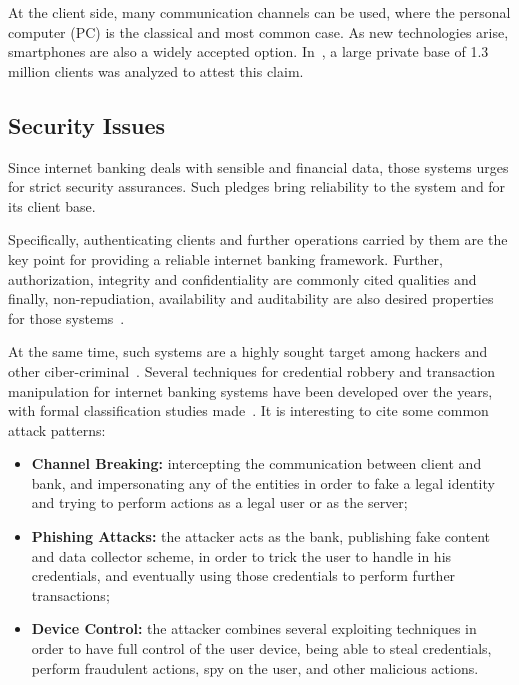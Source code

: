 At the client side, many communication channels can be used, where the personal computer (PC) is the classical and most common case. As new technologies arise, smartphones are also a widely accepted option. In~\cite{Peotta2012}, a large private base of 1.3 million clients was analyzed to attest this claim.

\subsection{Security Issues}
Since internet banking deals with sensible and financial data, those systems urges for strict security assurances. Such pledges bring reliability to the system and for its client base.

Specifically, authenticating clients and further operations carried by them are the key point for providing a reliable internet banking framework. Further, authorization, integrity and confidentiality are commonly cited qualities and finally, non-repudiation, availability and auditability are also desired properties for those systems~\cite{Hutchinson2003}.

At the same time, such systems are a highly sought target among hackers and other ciber-criminal~\cite{Peotta2011, Hutchinson2003}. Several techniques for credential robbery and transaction manipulation for internet banking systems have been developed over the years, with formal classification studies made~\cite{Peotta2011, Adham2013}. It is interesting to cite some common attack patterns:

\begin{itemize}
  \item \textbf{Channel Breaking:} intercepting the communication between client and bank, and impersonating any of the entities in order to fake a legal identity and trying to perform actions as a legal user or as the server;

  \item \textbf{Phishing Attacks:} the attacker acts as the bank, publishing fake content and data collector scheme, in order to trick the user to handle in his credentials, and eventually using those credentials to perform further transactions;

  \item \textbf{Device Control:} the attacker combines several exploiting techniques in order to have full control of the user device, being able to steal credentials, perform fraudulent actions, spy on the user, and other malicious actions.
\end{itemize}

